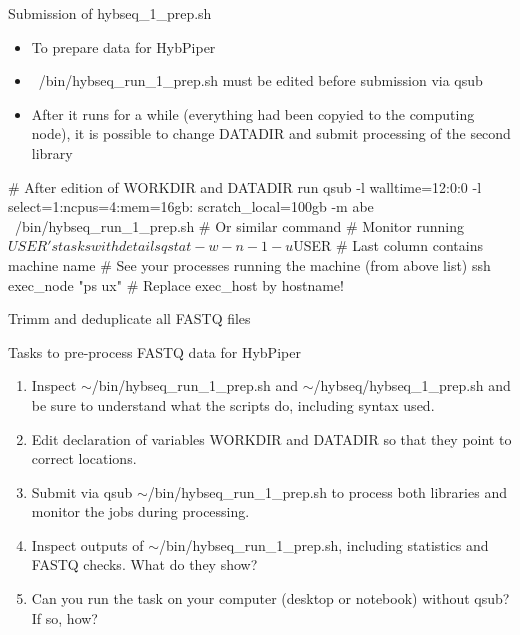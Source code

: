 \documentclass[compress, ucs, xelatex, 11pt, xcolor=x11names, aspectratio=169,
	hyperref={
		bookmarks=true,
		unicode=true,
		colorlinks=true,
		pdftitle={HybSeq course},
		plainpages=false,
		pdfauthor={Vojtech Zeisek},
		pdfsubject={Practical processing of HybSeq target enrichment sequencing data on computing grids like MetaCentrum},
		pdfcreator={XeLaTeX},
		pdfkeywords={BASH, command line, GNU, HybSeq, Linux, MetaCentrum, sequencing shell, target enrichment},
		linkcolor=Turquoise4, %
		anchorcolor=DodgerBlue4, %
		citecolor=DodgerBlue4, %
		filecolor=DodgerBlue4, %
		menucolor=Tan4, %
		urlcolor=DarkOliveGreen4, %
		pdftex},
	url={hyphens, lowtilde} %
	]{beamer}
\renewcommand{\texttt}[1]{\colorbox{Cornsilk2}{{\ttfamily #1}}}
\renewcommand{\alert}[1]{\textcolor{OrangeRed3}{#1}}
\begin{document}
\begin{frame}[fragile]{Submission of hybseq\_1\_prep.sh}
	\begin{itemize}
		\item To prepare data for HybPiper
		\item \alert{\texttt{~/bin/hybseq\_run\_1\_prep.sh} must be edited before submission via \texttt{qsub}}
		\item After it runs for a while (everything had been copyied to the computing node), it is possible to change \texttt{DATADIR} and submit processing of the second library
	\end{itemize}
	\begin{bashcode}
    # After edition of WORKDIR and DATADIR run
    qsub -l walltime=12:0:0 -l select=1:ncpus=4:mem=16gb:
      scratch_local=100gb -m abe ~/bin/hybseq_run_1_prep.sh
    # Or similar command
    # Monitor running $USER's tasks with details
    qstat -w -n -1 -u $USER # Last column contains machine name
    # See your processes running the machine (from above list)
    ssh exec_node "ps ux" # Replace exec_host by hostname!
	\end{bashcode}
\end{frame}

\begin{frame}{Trimm and deduplicate all FASTQ files}
	\begin{exampleblock}{Tasks to pre-process FASTQ data for HybPiper}
			\begin{enumerate}
				\item Inspect \texttt{$\sim$/bin/hybseq\_run\_1\_prep.sh} and \texttt{$\sim$/hybseq/hybseq\_1\_prep.sh} and be sure to understand what the scripts do, including syntax used.
				\item Edit declaration of variables \texttt{WORKDIR} and \texttt{DATADIR} so that they point to correct locations.
				\item Submit via \texttt{qsub} \texttt{$\sim$/bin/hybseq\_run\_1\_prep.sh} to process both libraries and monitor the jobs during processing.
				\item Inspect outputs of \texttt{$\sim$/bin/hybseq\_run\_1\_prep.sh}, including statistics and FASTQ checks. What do they show?
				\item Can you run the task on your computer (desktop or notebook) without \texttt{qsub}? If so, how?
		\end{enumerate}
	\end{exampleblock}
\end{frame}
\end{document}
